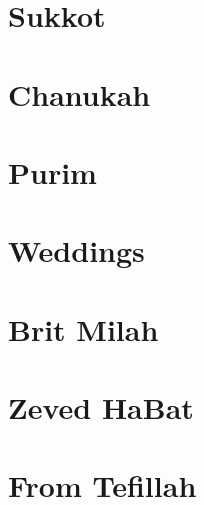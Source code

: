 \documentclass[letterpaper]{memoir}
\newcommand{\song}[2]{}
\begin{document}
\chapter{Sukkot}
\song{Sukkah v'Lulav (Moroccan)}{Sukkah_vLulav_Moroccan.pdf}
\song{Sukkah v'Lulav (Yerushalmi)}{Sukkah_vLulav_Yerushalmi.pdf}
\song{Chanun Rachem}{Chanun_Rachem.pdf}
\song{Yah Et Sukkat David Takim}{Yah_Et_Sukkat_David_Takim.pdf}

\chapter{Chanukah}
\song{Yah Hatzel Yonah}{Yah_Hatzel_Yonah.pdf}
\song{Heichalo Heichalo}{Heichalo_Heichalo.pdf}
\song{L'neri}{Lneri.pdf}

\chapter{Purim}
\song{Ronu Gilu}{Ronu_Gilu.pdf}
\song{Or Gilah}{Or_Gilah.pdf} %
\song{El Melech Ne'eman}{El_Melech_Neeman.pdf}
\song{Ezer Mitzarai}{Ezer_Mitzarai.pdf}

\chapter{Weddings}
\song{Yismach Hatani}{Yismach_Hatani.pdf}
\song{El Me'od Na'alah}{El_Meod_Naalah.pdf}
\song{Im Chacham Libecha Beni}{Im_Chacham_Libecha_Beni.pdf}
\song{Makhelot Am}{Makhelot_Am.pdf}
\song{Ya'alah Ya'alah (Yerushalmi)}{Yaalah_Yaalah_Yerushalmi.pdf}
\song{Ya'alah Ya'alah (Syrian)}{Yaalah_Yaalah_Syrian.pdf}
\song{Et Dodim Kalah}{Et_Dodim_Kalah.pdf}

\chapter{Brit Milah}
\song{Mah Tov Mah Na'im}{Mah_Tov_Mah_Naim.pdf}
\song{Yehi Shalom b'Cheleinu (Yerushalmi)}{Yehi_Shalom_bCheleinu_Yerushalmi.pdf}
\song{Yehi Shalom B'Cheleinu (Syrian)}{Yehi_Shalom_bCheleinu_Syrian.pdf}

\chapter{Zeved HaBat}
\song{Nava Yafa Tz'viyah}{Nava_Yafa_Tzviyah.pdf}

\chapter{From Tefillah}
\song{Azharot}{Azharot.pdf}
\song{Halleluyah Tehillim 150}{Halleluyah_Tehillim_150.pdf}
\song{Pitchu Li}{Pitchu_Li.pdf}
\end{document}
